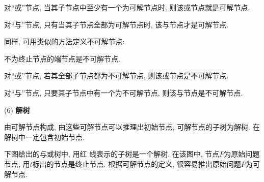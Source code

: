  对“或”节点, 当其子节点中至少有一个为可解节点时, 则该或节点就是可解节点.

 对“与”节点, 只有当其子节点全部为可解节点时, 该与节点才是可解节点.

同样, 可用类似的方法定义不可解节点:

 不为终止节点的端节点是不可解节点.

 对“或”节点, 若其全部子节点都为不可解节点, 则该或节点是不可解节点.

 对“与”节点, 只要其子节点中有一个为不可解节点, 则该与节点是不可解节点.

(6) \textbf{解树}

由可解节点构成, 由这些可解节点可以推理出初始节点, 可解节点的子树为解树. 在解树中一定包含初始节点.
\begin{example}
  下图给出的与或树中, 用红 线表示的子树是一个解树. 在该图中, 节点$P$为原始问题节点, 用$t$标出的节点是终止节点. 根据可解节点的定义, 很容易推出原始问题$P$为可解节点.
\end{example}

